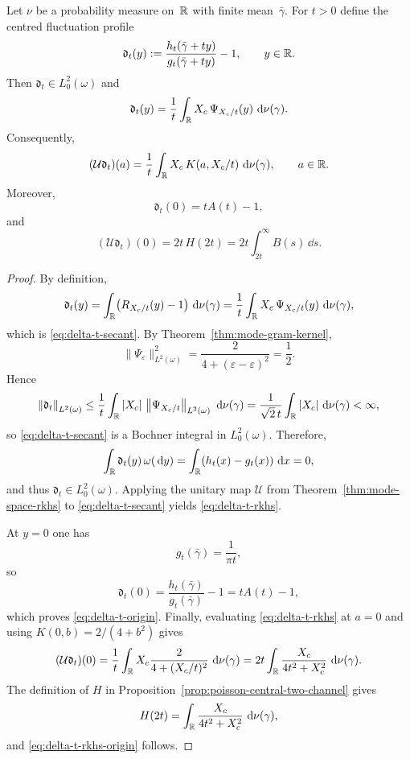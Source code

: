 \begin{theorem}%
\label{thm:poisson-channel-rkhs}
Let $\nu$ be a probability measure on~$\mathbb{R}$ with finite mean~$\bar{\gamma}$.
For $t>0$ define the centred fluctuation profile
\[
\mathfrak d_t(y):=
\frac{h_t(\bar{\gamma}+ty)}{g_t(\bar{\gamma}+ty)}-1,
\qquad y\in\mathbb{R}.
\]
Then $\mathfrak d_t\in L^2_0(\omega)$ and
\begin{equation}\label{eq:delta-t-secant}
\mathfrak d_t(y)
=\frac{1}{t}\int_{\mathbb{R}}X_c\,\Psi_{X_c/t}(y)\,\,\mathrm{d}\nu(\gamma).
\end{equation}
Consequently,
\begin{equation}\label{eq:delta-t-rkhs}
(\mathcal U\mathfrak d_t)(a)
=\frac{1}{t}\int_{\mathbb{R}}X_c\,K(a,X_c/t)\,\,\mathrm{d}\nu(\gamma),
\qquad a\in\mathbb{R}.
\end{equation}
Moreover,
\begin{equation}\label{eq:delta-t-origin}
\mathfrak d_t(0)=tA(t)-1,
\end{equation}
and
\begin{equation}\label{eq:delta-t-rkhs-origin}
(\mathcal U\mathfrak d_t)(0)=2t\,H(2t)
=2t\int_{2t}^{\infty}B(s)\,\dd s.
\end{equation}
\end{theorem}

\begin{proof}
By definition,
\[
\mathfrak d_t(y)
=\int_{\mathbb{R}}\bigl(R_{X_c/t}(y)-1\bigr)\,\,\mathrm{d}\nu(\gamma)
=\frac{1}{t}\int_{\mathbb{R}}X_c\,\Psi_{X_c/t}(y)\,\,\mathrm{d}\nu(\gamma),
\]
which is \eqref{eq:delta-t-secant}.  By Theorem~\ref{thm:mode-gram-kernel},
\[
\|\Psi_\varepsilon\|_{L^2(\omega)}^2
=\frac{2}{4+(\varepsilon-\varepsilon)^2}
=\frac12.
\]
Hence
\[
\left\|\mathfrak d_t\right\|_{L^2(\omega)}
\le\frac{1}{t}\int_{\mathbb{R}}|X_c|\,\left\|\Psi_{X_c/t}\right\|_{L^2(\omega)}\,\,\mathrm{d}\nu(\gamma)
=\frac{1}{\sqrt2\,t}\int_{\mathbb{R}}|X_c|\,\,\mathrm{d}\nu(\gamma)
<\infty,
\]
so \eqref{eq:delta-t-secant} is a Bochner integral in $L^2_0(\omega)$.
Therefore,
\[
\int_{\mathbb{R}}\mathfrak d_t(y)\,\omega(\,\mathrm{d} y)
=\int_{\mathbb{R}}(h_t(x)-g_t(x))\,\,\mathrm{d} x=0,
\]
and thus $\mathfrak d_t\in L^2_0(\omega)$.  Applying the unitary map
$\mathcal U$ from Theorem~\ref{thm:mode-space-rkhs} to
\eqref{eq:delta-t-secant} yields \eqref{eq:delta-t-rkhs}.

At $y=0$ one has
\[
g_t(\bar{\gamma})=\frac{1}{\pi t},
\]
so
\[
\mathfrak d_t(0)
=\frac{h_t(\bar{\gamma})}{g_t(\bar{\gamma})}-1
=tA(t)-1,
\]
which proves \eqref{eq:delta-t-origin}.  Finally, evaluating
\eqref{eq:delta-t-rkhs} at $a=0$ and using
$K(0,b)=2/(4+b^2)$ gives
\[
(\mathcal U\mathfrak d_t)(0)
=\frac{1}{t}\int_{\mathbb{R}}X_c\frac{2}{4+(X_c/t)^2}\,\,\mathrm{d}\nu(\gamma)
=2t\int_{\mathbb{R}}\frac{X_c}{4t^2+X_c^2}\,\,\mathrm{d}\nu(\gamma).
\]
The definition of $H$ in
Proposition~\ref{prop:poisson-central-two-channel} gives
\[
H(2t)=\int_{\mathbb{R}}\frac{X_c}{4t^2+X_c^2}\,\,\mathrm{d}\nu(\gamma),
\]
and \eqref{eq:delta-t-rkhs-origin} follows.
\end{proof}

